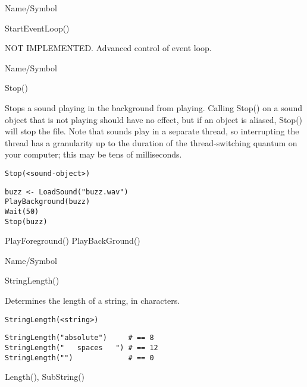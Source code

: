 \rl


\begin{desc}{Name/Symbol}
\item[Name/Symbol]  	StartEventLoop()

\item[Description]  	NOT IMPLEMENTED. Advanced control of event loop.

\item[Usage]		

\item[Example]	

\item[See Also]	
\end{desc}

\rl


\begin{desc}{Name/Symbol}
\item[Name/Symbol]  	Stop()	

\item[Description]  	Stops a sound playing in the background from playing.
		Calling Stop() on a sound object that is not playing should 
		have no effect, but if an object is aliased, Stop() will stop 
		the file.  Note that sounds play in a separate thread, so 
		interrupting the thread has a granularity up to the duration 
		of the thread-switching quantum on your computer; this may be 
		tens of milliseconds.

\item[Usage]
\begin{verbatim}
Stop(<sound-object>)
\end{verbatim}

\item[Example]     	
\begin{verbatim}
buzz <- LoadSound("buzz.wav")
PlayBackground(buzz)
Wait(50)
Stop(buzz)
\end{verbatim}

\item[See Also]    	PlayForeground() PlayBackGround()
\end{desc}

\rl


\begin{desc}{Name/Symbol}
\item[Name/Symbol]  	StringLength()

\item[Description] 	Determines the length of a string, in characters.

\item[Usage]
\begin{verbatim}
StringLength(<string>)
\end{verbatim}

\item[Example]     	
\begin{verbatim}
StringLength("absolute")     # == 8
StringLength("   spaces   ") # == 12
StringLength("")             # == 0
\end{verbatim}

\item[See Also]    	Length(), SubString()
\end{desc}

